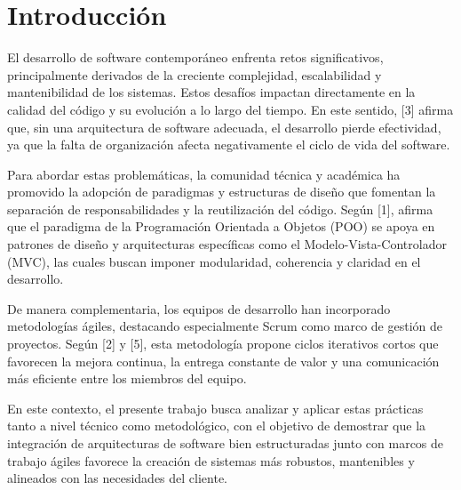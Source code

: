 \section{Introducción}
El desarrollo de software contemporáneo enfrenta retos significativos, principalmente derivados de la creciente complejidad, escalabilidad y mantenibilidad de los sistemas. Estos desafíos impactan directamente en la calidad del código y su evolución a lo largo del tiempo. En este sentido, [3] afirma que, sin una arquitectura de software adecuada, el desarrollo pierde efectividad, ya que la falta de organización afecta negativamente el ciclo de vida del software.

Para abordar estas problemáticas, la comunidad técnica y académica ha promovido la adopción de paradigmas y estructuras de diseño que fomentan la separación de responsabilidades y la reutilización del código. Según [1], afirma que el paradigma de la Programación Orientada a Objetos (POO) se apoya en patrones de diseño y arquitecturas específicas como el Modelo-Vista-Controlador (MVC), las cuales buscan imponer modularidad, coherencia y claridad en el desarrollo.

De manera complementaria, los equipos de desarrollo han incorporado metodologías ágiles, destacando especialmente Scrum como marco de gestión de proyectos. Según [2] y [5], esta metodología propone ciclos iterativos cortos que favorecen la mejora continua, la entrega constante de valor y una comunicación más eficiente entre los miembros del equipo.

En este contexto, el presente trabajo busca analizar y aplicar estas prácticas tanto a nivel técnico como metodológico, con el objetivo de demostrar que la integración de arquitecturas de software bien estructuradas junto con marcos de trabajo ágiles favorece la creación de sistemas más robustos, mantenibles y alineados con las necesidades del cliente.